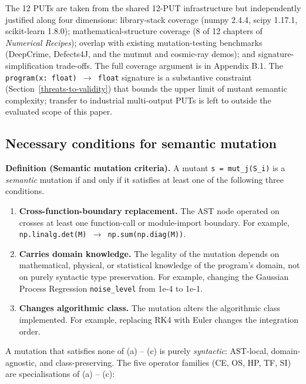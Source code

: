 \documentclass[manuscript,screen,review]{acmart}
\begin{document}
The 12 PUTs are taken from the shared 12-PUT infrastructure \citep{li2026minmrcomplete} but
independently justified along four dimensions: library-stack coverage
(numpy 2.4.4, scipy 1.17.1, scikit-learn 1.8.0); mathematical-structure
coverage (8 of 12 chapters of \emph{Numerical Recipes}); overlap with
existing mutation-testing benchmarks (DeepCrime, Defects4J, and the
mutmut and cosmic-ray demos); and signature-simplification trade-offs.
The full coverage argument is in Appendix B.1. The
\texttt{program(x:\ float)\ $\to$\ float} signature is a substantive
constraint (Section~\ref{threats-to-validity}) that bounds the upper limit of mutant semantic
complexity; transfer to industrial multi-output PUTs is left to
outside the evaluated scope of this paper.

\subsection{Necessary conditions for semantic mutation}\label{necessary-conditions-for-semantic-mutation-layer-1}

\textbf{Definition (Semantic mutation criteria).} A mutant
\texttt{s\textquotesingle{}\ =\ mut\_j(S\_i)} is a \emph{semantic}
mutation if and only if it satisfies at least one of the following three
conditions.

\begin{enumerate}
\item
  \textbf{Cross-function-boundary replacement.} The AST node operated on
  crosses at least one function-call or module-import boundary. For
  example, \texttt{np.linalg.det(M)\ $\to$\ np.sum(np.diag(M))}.
\item
  \textbf{Carries domain knowledge.} The legality of the mutation
  depends on mathematical, physical, or statistical knowledge of the
  program's domain, not on purely syntactic type preservation. For
  example, changing the Gaussian Process Regression
  \texttt{noise\_level} from 1e-4 to 1e-1.
\item
  \textbf{Changes algorithmic class.} The mutation alters the
  algorithmic class implemented. For example, replacing RK4 with Euler
  changes the integration order.
\end{enumerate}

A mutation that satisfies none of (a) -- (c) is purely \emph{syntactic}:
AST-local, domain-agnostic, and class-preserving. The five operator
families (CE, OS, HP, TF, SI) are specialisations of (a) -- (c):
\end{document}
